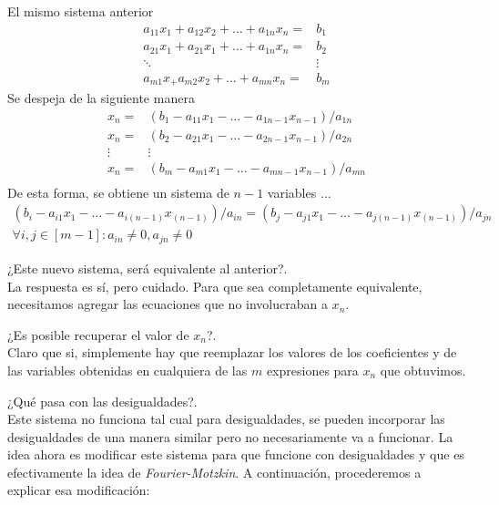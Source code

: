 \noindent El mismo sistema anterior 
\begin{equation*}
\begin{matrix}
    a_{11}x_1 +  a_{12}x_2 +  \ldots +  a_{1n}x_n = & b_1 \\
    a_{21}x_1 +  a_{21}x_1 +  \ldots +  a_{1n}x_n = & b_2 \\
                  \ddots                           & \vdots \\
    a_{m1}x_ +  a_{m2}x_2 +  \ldots +  a_{mn}x_n = & b_m
\end{matrix}
\end{equation*}
Se despeja de la siguiente manera
\begin{equation*}
\begin{matrix}
    x_n = &(b_1  - a_{11}x_1 - \ldots - a_{1n-1}x_{n-1})/ a_{1n} \\
    x_n = & (b_2  - a_{21}x_1 - \ldots - a_{2n-1}x_{n-1})/ a_{2n} \\
    \vdots&     \vdots                                  \\
    x_n = & (b_m  - a_{m1}x_1 - \ldots - a_{mn-1}x_{n-1})/ a_{mn} \\
\end{matrix}
\end{equation*}
De esta forma, se obtiene un sistema de $n-1$ variables $\ldots$
\begin{equation*}
   \begin{array}{c}
     (b_i-a_{i1}x_1-\ldots-a_{i(n-1)}x_{(n-1)})/a_{in} = (b_j-a_{j1}x_1-\ldots-a_{j(n-1)}x_{(n-1)})/a_{jn}  \\
     \forall i,j \in [m-1]: a_{in} \ne 0, a_{jn} \ne 0
\end{array} 
\end{equation*}

¿Este nuevo sistema, será equivalente al anterior?.\\
La respuesta es sí, pero cuidado. Para que sea completamente equivalente, necesitamos agregar las ecuaciones que no involucraban a $x_n$.

¿Es posible recuperar el valor de $x_n$?.\\
Claro que si, simplemente hay que reemplazar los valores de los coeficientes y de las variables obtenidas en cualquiera de las $m$ expresiones para $x_n$ que obtuvimos.

¿Qué pasa con las desigualdades?.\\
Este sistema no funciona tal cual para desigualdades, se pueden incorporar las desigualdades de una manera similar pero no necesariamente va a funcionar. La idea ahora es modificar este sistema para que funcione con desigualdades y que es efectivamente la idea de \emph{Fourier-Motzkin}. A continuación, procederemos a explicar esa modificación:\\


